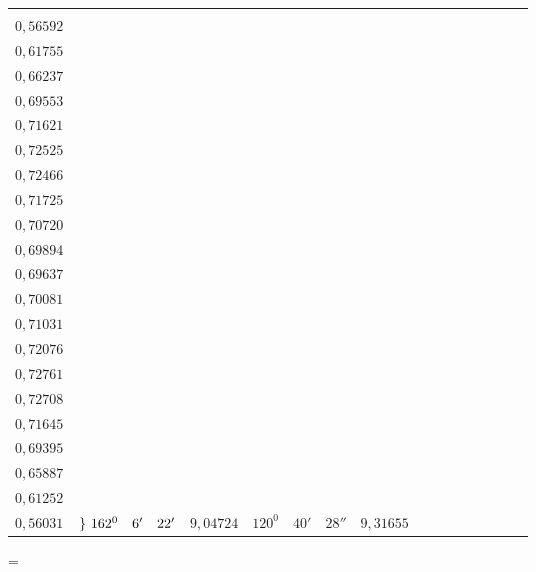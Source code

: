\begin{landscape}
\begin{center}
\begin{tabular}{r|r|r|r|r|r|r|r|r|r|r|r|r}
{\(0{,}51974\) \\
\(0{,}56592\) \\[3pt]
\(0{,}61755\) \\
\(0{,}66237\) \\
\(0{,}69553\) \\
\(0{,}71621\) \\[3pt]
\(0{,}72525\) \\
\(0{,}72466\) \\
\(0{,}71725\) \\
\(0{,}70720\) \\[3pt]
\(0{,}69894\) \\
\(0{,}69637\) \\
\(0{,}70081\) \\
\(0{,}71031\) \\[3pt]
\(0{,}72076\) \\
\(0{,}72761\) \\
\(0{,}72708\) \\
\(0{,}71645\) \\[3pt]
\(0{,}69395\) \\
\(0{,}65887\) \\
\(0{,}61252\) \\
\(0{,}56031\)
}
&
\(\left.\vphantom{\copy0}\right\}\,162^0\quad 6'\quad 22'\)
& \(9{,}04724\)
& \(120^0\quad 40'\quad 28''\)
& \(9{,}31655\) \\
\end{tabular}
\end{center}
\newpage
{}=\hbox{}
\end{landscape}
